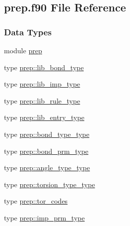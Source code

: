 \hypertarget{prep_8f90}{\subsection{prep.\-f90 File Reference}
\label{prep_8f90}
}
\subsubsection*{Data Types}
\begin{DoxyCompactItemize}
\item 
module \hyperlink{classprep}{prep}
\item 
type \hyperlink{structprep_1_1lib__bond__type}{prep\-::lib\-\_\-bond\-\_\-type}
\item 
type \hyperlink{structprep_1_1lib__imp__type}{prep\-::lib\-\_\-imp\-\_\-type}
\item 
type \hyperlink{structprep_1_1lib__rule__type}{prep\-::lib\-\_\-rule\-\_\-type}
\item 
type \hyperlink{structprep_1_1lib__entry__type}{prep\-::lib\-\_\-entry\-\_\-type}
\item 
type \hyperlink{structprep_1_1bond__type__type}{prep\-::bond\-\_\-type\-\_\-type}
\item 
type \hyperlink{structprep_1_1bond__prm__type}{prep\-::bond\-\_\-prm\-\_\-type}
\item 
type \hyperlink{structprep_1_1angle__type__type}{prep\-::angle\-\_\-type\-\_\-type}
\item 
type \hyperlink{structprep_1_1torsion__type__type}{prep\-::torsion\-\_\-type\-\_\-type}
\item 
type \hyperlink{structprep_1_1tor__codes}{prep\-::tor\-\_\-codes}
\item 
type \hyperlink{structprep_1_1imp__prm__type}{prep\-::imp\-\_\-prm\-\_\-type}
\end{DoxyCompactItemize}
